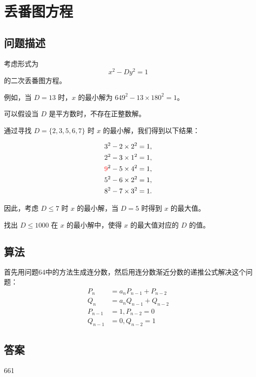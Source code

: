 \section{丢番图方程}
\subsection{问题描述}
\begin{tcolorbox}
	考虑形式为
	\[ x^2 - D y^2 = 1 \]
	的二次丢番图方程。

	例如，当 \( D = 13 \) 时，\( x \) 的最小解为 \( 649^2 - 13 \times 180^2 = 1 \)。

	可以假设当 \( D \) 是平方数时，不存在正整数解。

	通过寻找 \( D = \{2, 3, 5, 6, 7\} \) 时 \( x \) 的最小解，我们得到以下结果：

	\begin{align*}
		3^2 - 2 \times 2^2       & = 1, \\
		2^2 - 3 \times 1^2       & = 1, \\
		\textcolor{red}{9}^2 - 5 \times 4^2 & = 1, \\
		5^2 - 6 \times 2^2       & = 1, \\
		8^2 - 7 \times 3^2       & = 1.
	\end{align*}

	因此，考虑 \( D \leq 7 \) 时 \( x \) 的最小解，当 \( D = 5 \) 时得到 \( x \) 的最大值。

	找出 \( D \leq 1000 \) 在 \( x \) 的最小解中，使得 \( x \) 的最大值对应的 \( D \) 的值。

\end{tcolorbox}

\subsection{算法}
首先用问题64中的方法生成连分数，然后用连分数渐近分数的递推公式解决这个问题：
\begin{align*}
	P_n     & = a_nP_{n-1} + P_{n-2} \\
	Q_n     & = a_nQ_{n-1} + Q_{n-2} \\
	P_{n-1} & = 1, P_{n-2} = 0       \\
	Q_{n-1} & = 0, Q_{n-2} = 1
\end{align*}

\subsection{答案}
661
